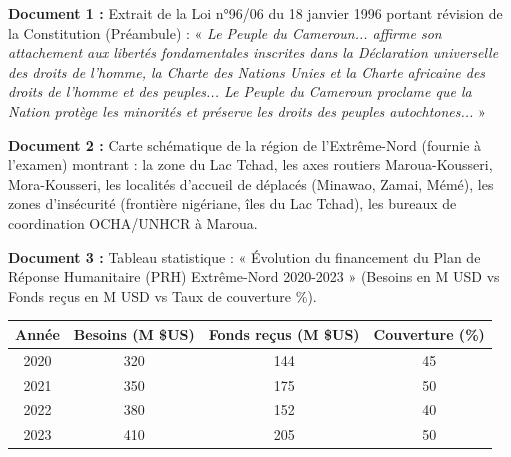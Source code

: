 \documentclass[11pt]{article}
\begin{document}
\begin{exercice}
\textbf{Document 1 :} Extrait de la Loi n°96/06 du 18 janvier 1996 portant révision de la Constitution (Préambule) : « \emph{Le Peuple du Cameroun... affirme son attachement aux libertés fondamentales inscrites dans la Déclaration universelle des droits de l'homme, la Charte des Nations Unies et la Charte africaine des droits de l'homme et des peuples... Le Peuple du Cameroun proclame que la Nation protège les minorités et préserve les droits des peuples autochtones...} »

\textbf{Document 2 :} Carte schématique de la région de l'Extrême-Nord (fournie à l'examen) montrant : la zone du Lac Tchad, les axes routiers Maroua-Kousseri, Mora-Kousseri, les localités d'accueil de déplacés (Minawao, Zamai, Mémé), les zones d'insécurité (frontière nigériane, îles du Lac Tchad), les bureaux de coordination OCHA/UNHCR à Maroua.

\textbf{Document 3 :} Tableau statistique : « Évolution du financement du Plan de Réponse Humanitaire (PRH) Extrême-Nord 2020-2023 » (Besoins en M USD vs Fonds reçus en M USD vs Taux de couverture \%).
\begin{center}
\begin{tabular}{|c|c|c|c|}\hline
\textbf{Année} & \textbf{Besoins (M \$US)} & \textbf{Fonds reçus (M \$US)} & \textbf{Couverture (\%)} \\ \hline
2020 & 320 & 144 & 45 \\ \hline
2021 & 350 & 175 & 50 \\ \hline
2022 & 380 & 152 & 40 \\ \hline
2023 & 410 & 205 & 50 \\ \hline
\end{tabular}
\end{center}


\end{exercice}
\end{document}
